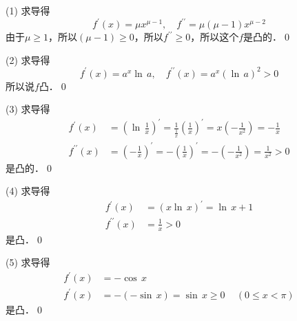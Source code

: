 (1) \prove 求导得
\begin{equation}
    f^{\prime}(x) = \mu x^{\mu - 1}, \quad f^{\prime\prime} = \mu \left(\mu - 1\right) x^{\mu - 2}
\end{equation}
由于$\mu \geq 1$，所以$\left(\mu - 1\right) \geq 0$，所以$f^{\prime\prime} \geq 0$，所以这个$f$是凸的．\qed\bigskip

(2) \prove 求导得
\begin{equation}
    f^{\prime}(x) = a^x \ln \, a, \quad f^{\prime\prime}(x) = a^x \left( \ln \, a\right)^2 > 0
\end{equation}
所以说$f$凸．\qed\bigskip

(3) \prove 求导得
\begin{align}
    f^{\prime}(x) &= \left( \ln \, \frac{1}{x}\right)^\prime = \displaystyle\frac{1}{\displaystyle\frac{1}{x}} \left(\displaystyle\frac{1}{x}\right)^{\prime} = x \left(- \frac{1}{x^2}\right) = -\frac{1}{x} \\
    f^{\prime\prime}(x) &= \left(- \displaystyle\frac{1}{x}\right)^{\prime} = - \left(\displaystyle\frac{1}{x}\right)^{\prime} = - \left(- \frac{1}{x^2}\right) = \frac{1}{x^2} > 0
\end{align}
是凸的．\qed\bigskip

(4) \prove 求导得
\begin{align}
    f^{\prime}(x) &= \left(x \ln \, x\right)^{\prime} = \ln \, x + 1  \\
    f^{\prime\prime}(x) &= \frac{1}{x} > 0
\end{align}
是凸．\qed\bigskip

(5) \prove 求导得
\begin{align}
    f^{\prime}(x) &= - \cos \, x \\
    f^{\prime}(x) &= - \left(- \sin \, x\right) = \sin \, x \geq 0 \, \quad (0 \leq x < \pi)
\end{align}
是凸．\qed\bigskip